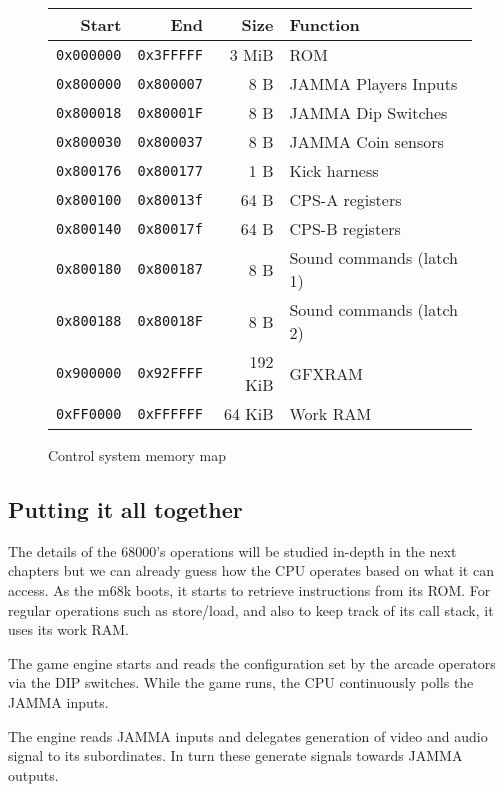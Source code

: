 \begin{figure}[H]
{
\begin{tabularx}{\textwidth}{rrrX}
  \textbf{Start } & \textbf{End  } & \textbf{Size } & \textbf{Function } \\               
  \toprule    
  \texttt{0x000000} & \texttt{0x3FFFFF} & 3 MiB & ROM \\
  \toprule    
  \texttt{0x800000} & \texttt{0x800007} & 8 B & JAMMA Players Inputs \\
  \texttt{0x800018} & \texttt{0x80001F} & 8 B & JAMMA Dip Switches \\
  \texttt{0x800030} & \texttt{0x800037} & 8 B & JAMMA Coin sensors \\
  \texttt{0x800176} & \texttt{0x800177} & 1 B & Kick harness \\
\toprule    
  \texttt{0x800100} & \texttt{0x80013f} & 64 B & CPS-A registers\\
  \texttt{0x800140} & \texttt{0x80017f} & 64 B & CPS-B registers\\
\toprule    
  \texttt{0x800180} & \texttt{0x800187} & 8 B & Sound commands (latch 1)\\
  \texttt{0x800188} & \texttt{0x80018F} & 8 B & Sound commands (latch 2)\\
  \toprule    
  \texttt{0x900000} & \texttt{0x92FFFF} & 192 KiB & GFXRAM\\
  \texttt{0xFF0000} & \texttt{0xFFFFFF} & 64 KiB & Work RAM \\
\end{tabularx}%
}\caption*{Control system memory map}
\end{figure} \label{m68k_mm}

\subsection{Putting it all together}

The details of the 68000's operations will be studied in-depth in the next chapters but we can already guess how the CPU operates based on what it can access. As the m68k boots, it starts to retrieve instructions from its ROM. For regular operations such as store/load, and also to keep track of its call stack, it uses its work RAM. 

The game engine starts and reads the configuration set by the arcade operators via the DIP switches. While the game runs, the CPU continuously polls the JAMMA inputs.

The engine reads JAMMA inputs and delegates generation of video and audio signal to its subordinates. In turn these generate signals towards JAMMA outputs.

